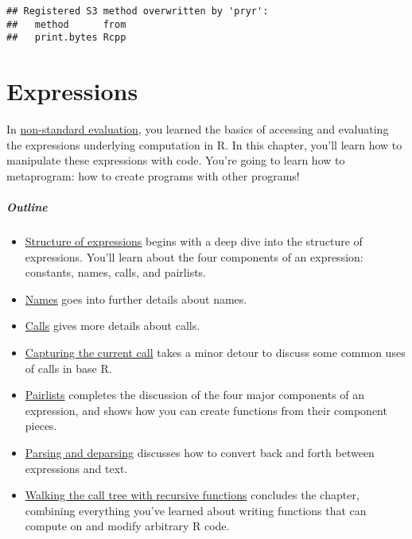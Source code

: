 \begin{verbatim}
## Registered S3 method overwritten by 'pryr':
##   method      from
##   print.bytes Rcpp
\end{verbatim}

\hypertarget{metaprogramming}{%
\chapter{Expressions}\label{metaprogramming}}

In \protect\hyperlink{nse}{non-standard evaluation}, you learned the
basics of accessing and evaluating the expressions underlying
computation in R. In this chapter, you'll learn how to manipulate these
expressions with code. You're going to learn how to metaprogram: how to
create programs with other programs! 

\hypertarget{outline}{%
\paragraph{Outline}\label{outline}}

\begin{itemize}
\item
  \protect\hyperlink{structure-of-expressions}{Structure of expressions}
  begins with a deep dive into the structure of expressions. You'll
  learn about the four components of an expression: constants, names,
  calls, and pairlists.
\item
  \protect\hyperlink{names}{Names} goes into further details about
  names.
\item
  \protect\hyperlink{calls}{Calls} gives more details about calls.
\item
  \protect\hyperlink{capturing-call}{Capturing the current call} takes a
  minor detour to discuss some common uses of calls in base R.
\item
  \protect\hyperlink{pairlists}{Pairlists} completes the discussion of
  the four major components of an expression, and shows how you can
  create functions from their component pieces.
\item
  \protect\hyperlink{parsing-and-deparsing}{Parsing and deparsing}
  discusses how to convert back and forth between expressions and text.
\item
  \protect\hyperlink{ast-funs}{Walking the call tree with recursive
  functions} concludes the chapter, combining everything you've learned
  about writing functions that can compute on and modify arbitrary R
  code.
\end{itemize}

